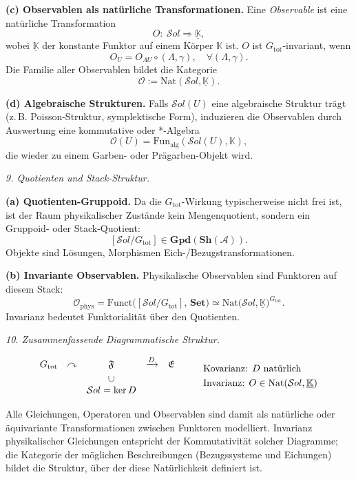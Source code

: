 \documentclass[10pt, letterpaper]{article}
\begin{document}
\textbf{(c) Observablen als natürliche Transformationen.}
Eine \emph{Observable} ist eine natürliche Transformation
\[
O:\ \mathcal S ol \Rightarrow \underline{\mathbb K},
\]
wobei $\underline{\mathbb K}$ der konstante Funktor auf einem Körper
$\mathbb K$ ist.  
$O$ ist $G_{\mathrm{tot}}$-invariant, wenn
\[
O_U = O_{\Lambda U}\circ (\Lambda,\gamma),
\quad \forall (\Lambda,\gamma).
\]
Die Familie aller Observablen bildet die Kategorie
\[
\mathcal O := \mathrm{Nat}(\mathcal S ol,\underline{\mathbb K}).
\]

\textbf{(d) Algebraische Strukturen.}
Falls $\mathcal S ol(U)$ eine algebraische Struktur trägt
(z.\,B. Poisson-Struktur, symplektische Form),
induzieren die Observablen durch Auswertung
eine kommutative oder *-Algebra
\[
\mathcal O(U)=\mathrm{Fun}_{\mathrm{alg}}(\mathcal S ol(U),\mathbb K),
\]
die wieder zu einem Garben- oder Prägarben-Objekt wird.

\bigskip
\emph{9. Quotienten und Stack-Struktur.}

\textbf{(a) Quotienten-Gruppoid.}
Da die $G_{\mathrm{tot}}$-Wirkung typischerweise nicht frei ist,
ist der Raum physikalischer Zustände kein Mengenquotient, sondern
ein Gruppoid- oder Stack-Quotient:
\[
[\mathcal S ol / G_{\mathrm{tot}}]
\in \mathbf{Gpd}(\mathbf{Sh}(\mathcal A)).
\]
Objekte sind Lösungen, Morphismen Eich-/Bezugstransformationen.

\textbf{(b) Invariante Observablen.}
Physikalische Observablen sind Funktoren auf diesem Stack:
\[
\mathcal O_{\mathrm{phys}}
=\mathrm{Funct}\big([\mathcal S ol / G_{\mathrm{tot}}],\,\mathbf{Set}\big)
\simeq \mathrm{Nat}\big(\mathcal S ol,\underline{\mathbb K}\big)^{G_{\mathrm{tot}}}.
\]
Invarianz bedeutet Funktorialität über den Quotienten.

\bigskip
\emph{10. Zusammenfassende Diagrammatische Struktur.}

\[
\begin{array}{ccccc}
G_{\mathrm{tot}}
& \curvearrowright & \mathfrak F & \xrightarrow{D} & \mathfrak E\\[0.4em]
& & \rotatebox{90}{$\subset$} & & \\[-0.1em]
& & \mathcal S ol=\ker D & &
\end{array}
\qquad
\begin{array}{l}
\text{Kovarianz: } D\text{ natürlich}\\[0.3em]
\text{Invarianz: } O\in\mathrm{Nat}(\mathcal S ol,\underline{\mathbb K})
\end{array}
\]

Alle Gleichungen, Operatoren und Observablen sind damit als
natürliche oder äquivariante Transformationen zwischen Funktoren modelliert.
Invarianz physikalischer Gleichungen entspricht der
Kommutativität solcher Diagramme; die Kategorie der möglichen
Beschreibungen (Bezugssysteme und Eichungen) bildet die
Struktur, über der diese Natürlichkeit definiert ist.
\end{document}
